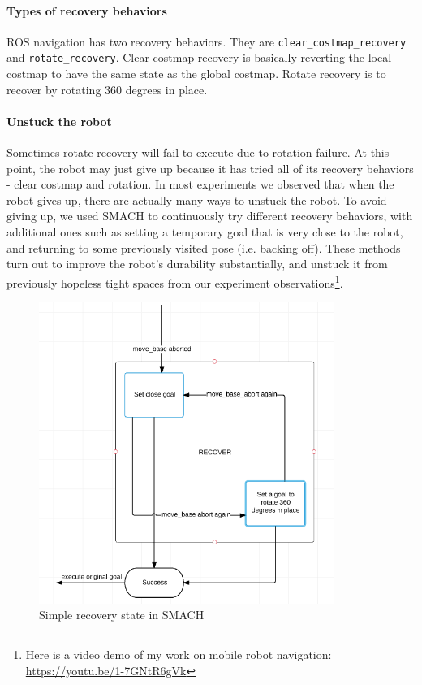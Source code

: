 \documentclass[12pt]{article}
\begin{document}
\paragraph{Types of recovery behaviors} ROS navigation has two recovery behaviors. They are \texttt{clear\_costmap\_recovery} and \texttt{rotate\_recovery}. Clear costmap recovery is basically reverting the local costmap to have the same state as the global costmap. Rotate recovery is to recover by
rotating 360 degrees in place. 

\paragraph{Unstuck the robot} Sometimes rotate recovery will fail to execute due to rotation failure. At this point, the robot may just give up because it has tried
all of its recovery behaviors - clear costmap and rotation. In most experiments we observed that when the robot gives up, there are actually many ways to unstuck the robot.
To avoid giving up, we used SMACH to continuously try different recovery behaviors, with additional ones such as setting a temporary goal that is very close to the robot, and returning to some previously visited pose (i.e. backing off). These methods turn out to improve the robot's durability substantially, and unstuck it from previously hopeless tight spaces from our experiment observations\footnote{Here is a video demo of my work on mobile robot navigation: \url{https://youtu.be/1-7GNtR6gVk}}.

\begin{figure}[!h]
    \begin{center}
        \includegraphics[width=26em]{Recovery.png} \caption{Simple recovery state in SMACH}
    \end{center}
\end{figure}
\end{document}
